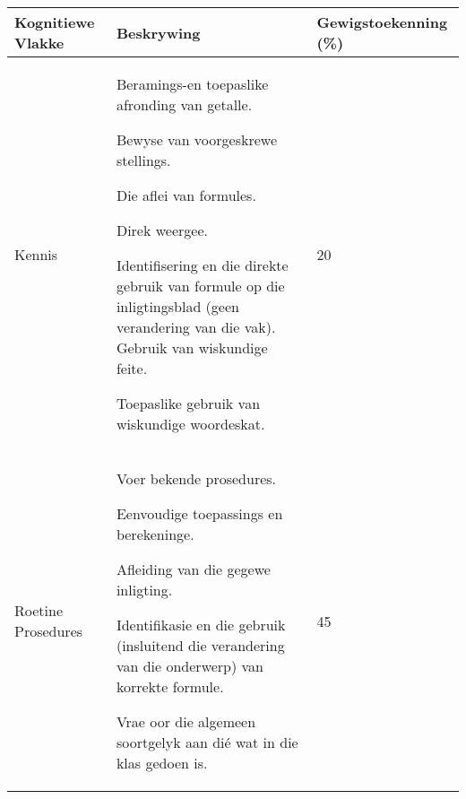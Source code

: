 \begin{table}[H]
\begin{center}
\begin{tabular} {|p{3cm}|p{7cm}|p{1.5cm}|} \hline
\textbf{Kognitiewe Vlakke} & \textbf{Beskrywing} & \textbf{Gewigstoekenning (\%)} \\ \hline
Kennis & 
Beramings-en toepaslike afronding van getalle. \par 
Bewyse van voorgeskrewe stellings. \par 
Die aflei van formules. \par 
Direk weergee. \par 
Identifisering en die direkte gebruik van formule op die inligtingsblad (geen verandering van die vak). Gebruik van wiskundige feite. \par 
Toepaslike gebruik van wiskundige woordeskat.
& 
20 \\ \hline

Roetine Prosedures & 
Voer bekende prosedures. \par 
Eenvoudige toepassings en berekeninge. \par 
Afleiding van die gegewe inligting. \par 
Identifikasie en die gebruik (insluitend die verandering van die onderwerp) van korrekte formule. \par 
Vrae oor die algemeen soortgelyk aan di\'{e} wat in die klas gedoen is.
&
45 \\ \hline


\end{tabular}
\end{center}
\end{table}
